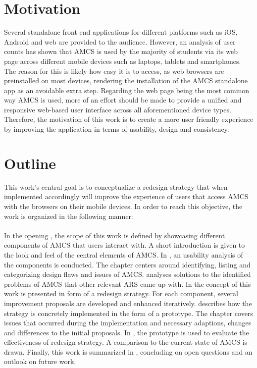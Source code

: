 \section{Motivation}
Several standalone front end applications for different platforms such as iOS, Android and web are provided to the audience. However, an analysis of user counts has shown that AMCS is used by the majority of students via its web page across different mobile devices such as laptops, tablets and smartphones.
The reason for this is likely how easy it is to access, as web browsers are preinstalled on most devices, rendering the installation of the AMCS standalone app as an avoidable extra step.
\newline
\newline 
Regarding the web page being the most common way AMCS is used, more of an effort should be made to provide a unified and responsive web-based user interface across all aforementioned device types.
\newline
\newline 
Therefore, the motivation of this work is to create a more user friendly experience by improving the application in terms of usability, design and consistency.
\section{Outline}
\label{section:intro:objective}
This work's central goal is to conceptualize a redesign strategy that when implemented accordingly will improve the experience of users that access AMCS with the browsers on their mobile devices. In order to reach this objective, the work is organized in the following manner:
\\
\\
In the opening , the scope of this work is defined by showcasing different components of AMCS that users interact with. A short introduction is given to the look and feel of the central elements of AMCS.
In , an usability analysis of the components is conducted. The chapter centers around identifying, listing and categorizing design flaws and issues of AMCS. 
 analyses solutions to the identified problems of AMCS that other relevant ARS came up with.
In  the concept of this work is presented in form of a redesign strategy. For each component, several improvement proposals are developed and enhanced iteratively. 
 describes how the strategy is concretely implemented in the form of a prototype. The chapter covers issues that occurred during the implementation and necessary adaptions, changes and differences to the initial proposals.
In , the prototype is used to evaluate the effectiveness of redesign strategy. A comparison to the current state of AMCS is drawn.
Finally, this work is summarized in , concluding on open questions and an outlook on future work.